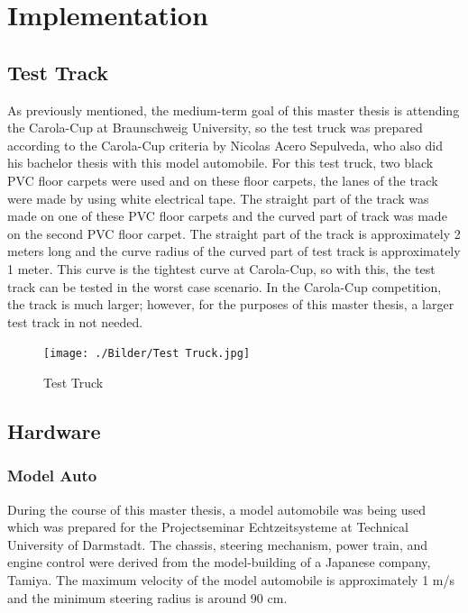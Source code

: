 %
\chapter{Implementation}\label{cha:Implementation}
%
\section{Test Track}\label{sec:Test Track}

As previously mentioned, the medium-term goal of this master thesis is attending the Carola-Cup at Braunschweig University, so the test truck was prepared according to the Carola-Cup criteria by Nicolas Acero Sepulveda, who also did his bachelor thesis with this model automobile. For this test truck, two black PVC floor carpets were used and on these floor carpets, the lanes of the track were made by using white electrical tape. The straight part of the track was made on one of these PVC floor carpets and the curved part of track was made on the second PVC floor carpet. The straight part of the track is approximately 2 meters long and the curve radius of the curved part of test track is approximately 1 meter. This curve is the tightest curve at Carola-Cup, so with this, the test track can be tested in the worst case scenario. In the Carola-Cup competition, the track is much larger; however, for the purposes of this master thesis, a larger test track in not needed.

\begin{figure}[H]
	\centering
	\hspace*{0cm}   
	\texttt{[image: ./Bilder/Test Truck.jpg]}
	\caption{Test Truck}
\end{figure}

%
\section{Hardware}\label{sec:Hardware}



%
\subsection{Model Auto}\label{sec:Model Auto}


During the course of this master thesis, a model automobile was being used which was prepared for the Projectseminar 
Echtzeitsysteme at Technical University of Darmstadt. The chassis, steering mechanism, power train, and engine control 
were derived from the model-building of a Japanese company, Tamiya. The maximum velocity of the model automobile is 
approximately 1 m/s and the minimum steering radius is around 90 cm. 

